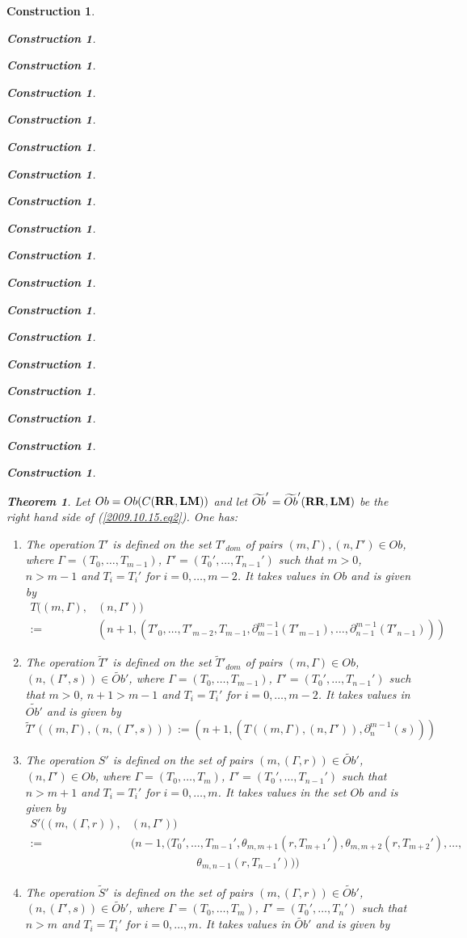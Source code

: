 \documentclass[12pt]{amsart}
\newtheorem{theorem}[proposition]{Theorem}
\numberwithin{proposition}{subsection}
\newtheorem{construction}[proposition]{Construction}
\newcommand{\llabel}[1]{\label{#1}}
\newcommand{\wt}{\widetilde}
\newcommand{\spc}{{\,\,\,\,\,\,\,}}
\newcommand{\RR}{{\bf RR}}
\newcommand{\LM}{{\bf LM}}
\begin{document}
\begin{construction}
\begin{construction}
\begin{construction}
\begin{construction}
\begin{construction}
\begin{construction}
\begin{construction}
\begin{construction}
\begin{construction}
\begin{construction}
\begin{construction}
\begin{construction}
\begin{construction}
\begin{construction}
\begin{construction}
\begin{construction}
\begin{construction}
\begin{construction}
  
%
\begin{theorem}\llabel{2015.08.26.th2}
Let $Ob=Ob(C(\RR,\LM))$ and let $\wt{Ob}'=\wt{Ob}'(\RR,\LM)$ be the right hand side of (\ref{2009.10.15.eq2}). One has:
%
\begin{enumerate}
\item The operation $T'$ is defined on the set $T'_{dom}$ of pairs
  $(m,\Gamma),(n,\Gamma')\in Ob$, where $\Gamma=(T_0,\dots,T_{m-1})$,
  $\Gamma'=(T_0',\dots,T_{n-1}')$ such that $m>0$, $n>m-1$ and $T_i=T_i'$ for
  $i=0,\dots,m-2$. It takes values in $Ob$ and is given by
%
\begin{equation*}
  \begin{split}
    T((m,\Gamma),&(n,\Gamma'))
    \\:= &(n+1,(T'_0,\dots,T'_{m-2},T_{m-1},\partial_{m-1}^{m-1}(T'_{m-1}),\dots,\partial_{n-1}^{m-1}(T'_{n-1})))
  \end{split}
\end{equation*}
%
\item The operation $\wt{T}'$ is defined on the set $\wt{T}'_{dom}$ of pairs
  $(m,\Gamma)\in Ob$, $(n,(\Gamma',s))\in\wt{Ob}'$, where
  $\Gamma=(T_0,\dots,T_{m-1})$, $\Gamma'=(T_0',\dots,T_{n-1}')$ such that
  $m>0$, $n+1>m-1$ and $T_i=T_i'$ for $i=0,\dots,m-2$. It takes values in
  $\wt{Ob'}$ and is given by
%
$$\wt{T}'((m,\Gamma),(n,(\Gamma',s))):=(n+1,(T((m,\Gamma),(n,\Gamma')),\partial_{n}^{m-1}(s)))$$
%
\item The operation $S'$ is defined on the set of pairs $(m,(\Gamma,r))\in
  \wt{Ob}'$, $(n,\Gamma')\in Ob$, where $\Gamma=(T_0,\dots,T_{m})$,
  $\Gamma'=(T_0',\dots,T_{n-1}')$ such that $n>m+1$ and $T_i=T_i'$ for
  $i=0,\dots,m$. It takes values in the set $Ob$ and is given by
%
\begin{equation*}
  \begin{split}
    S'((m,(\Gamma,r)),&(n,\Gamma'))
    \\ :=& (n-1,(T_0',\dots,T_{m-1}',\theta_{m,m+1}(r,T_{m+1}'),\theta_{m,m+2}(r,T_{m+2}'),\dots,
    \\  & \spc\spc\spc\spc\spc
    \theta_{m,n-1}(r,T_{n-1}')))
  \end{split}
\end{equation*}
%
\item The operation $\wt{S}'$ is defined on the set of pairs $(m,(\Gamma,r))\in
  \wt{Ob}'$, $(n,(\Gamma',s))\in \wt{Ob}'$, where $\Gamma=(T_0,\dots,T_{m})$,
  $\Gamma'=(T_0',\dots,T_{n}')$ such that $n>m$ and $T_i=T_i'$ for
  $i=0,\dots,m$. It takes values in $\wt{Ob}'$ and is given by
%

\end{enumerate}
\end{theorem}
\end{construction}
\end{construction}
\end{construction}
\end{construction}
\end{construction}
\end{construction}
\end{construction}
\end{construction}
\end{construction}
\end{construction}
\end{construction}
\end{construction}
\end{construction}
\end{construction}
\end{construction}
\end{construction}
\end{construction}
\end{construction}
\end{document}
